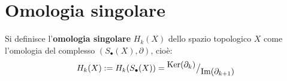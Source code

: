 



\section{Omologia singolare}

\begin{definition}
  Si definisce l'\textbf{omologia singolare} $ H_k(X) $ dello spazio topologico $ X $
  come l'omologia del complesso $ (S_\bullet(X),\partial) $, cioè:
  \[
    H_k(X) := H_k(S_\bullet(X)) = {^{\textstyle \mathrm{Ker}( \partial_k)}\big/_{\textstyle \mathrm{Im}( \partial_{k+1} )}}
  \]
\end{definition}

